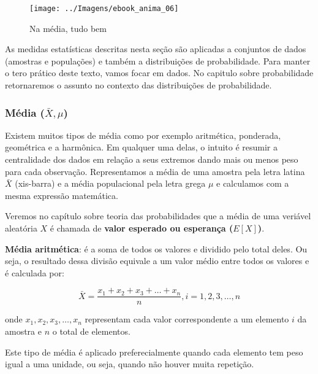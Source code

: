 \documentclass[12pt,]{style/krantz}
\renewenvironment{quote}{\begin{VF}}{\end{VF}}
\theoremstyle{definition}
\theoremstyle{definition}
\theoremstyle{definition}
\theoremstyle{remark}
\begin{document}
\begin{figure}[H]

{\centering \texttt{[image: ../Imagens/ebook\_anima\_06]} 

}

\caption{Na média, tudo bem}\label{fig:fig07}
\end{figure}

\begin{quote}
As medidas estatísticas descritas nesta seção são aplicadas a conjuntos de dados (amostras e populações) e também a distribuições de probabilidade. Para manter o tero prático deste texto, vamos focar em dados. No capitulo sobre probabilidade retornaremos o assunto no contexto das distribuições de probabilidade.
\end{quote}

\hypertarget{media-bar-x-mu}{%
\subsubsection{\texorpdfstring{Média (\(\bar X, \mu\))}{Média (\textbackslash{}bar X, \textbackslash{}mu)}}\label{media-bar-x-mu}}

Existem muitos tipos de média como por exemplo aritmética, ponderada, geométrica e a harmônica. Em qualquer uma delas, o intuito é resumir a centralidade dos dados em relação a seus extremos dando mais ou menos peso para cada observação. Representamos a média de uma amostra pela letra latina \(\bar X\) (xis-barra) e a média populacional pela letra grega \(\mu\) e calculamos com a mesma expressão matemática.

\begin{quote}
Veremos no capítulo sobre teoria das probabilidades que a média de uma veriável aleatória \(X\) é chamada de \textbf{valor esperado ou esperança (\(E[X]\))}.
\end{quote}

\textbf{Média aritmética}: é a soma de todos os valores e dividido pelo total deles. Ou seja, o resultado dessa divisão equivale a um valor médio entre todos os valores e é calculada por:

\[\bar X = \frac{x_1 + x_2 + x_3 + \dots + x_n}{n}, i = 1, 2, 3, \dots, n\]

onde \(x_1, x_2, x_3, \dots, x_n\) representam cada valor correspondente a um elemento \(i\) da amostra e \(n\) o total de elementos.

\begin{quote}
Este tipo de média é aplicado preferecialmente quando cada elemento tem peso igual a uma unidade, ou seja, quando não houver muita repetição.
\end{quote}
\end{document}
